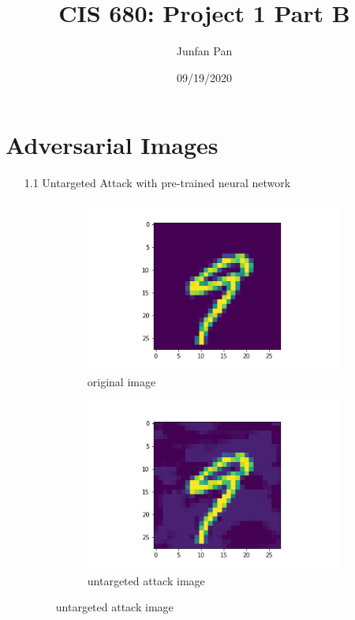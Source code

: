 \documentclass{article}
\title{CIS 680: Project 1 Part B}
\author{Junfan Pan}
\date{09/19/2020}
\begin{document}
    \maketitle
    
    \section{Adversarial Images}
    \noindent
    \begin{enumerate}
    	\item[1.1] 
    	Untargeted Attack with pre-trained neural network\\
        \begin{figure}[H]
     	\centering
     	\begin{subfigure}[b]{0.45\textwidth}
         	\centering
         	\includegraphics[width=\textwidth]
         	{image/No.0 original test_image.png}
         	\caption{original image}
         	\label{fig:Hyperplane Epoch 0}
     	\end{subfigure}
     	\hfill
     	\begin{subfigure}[b]{0.45\textwidth}
         	\centering
         	\includegraphics[width=\textwidth]
         	{image/No.0 perturbed test_image.png}
         	\caption{untargeted attack image}
         	\label{fig:Hyperplane Epoch 1000}
     	\end{subfigure}
     	\end{figure}
     	

\end{enumerate}
\end{document}
